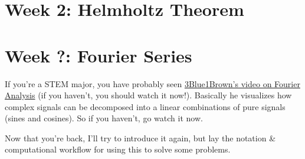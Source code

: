 \documentclass[12pt,fleqn]{article}
\numberwithin{equation}{section} %
\newcounter{problem}
\begin{document}
\newpage
\section{Week 2: Helmholtz Theorem}

\newpage
\section{Week ?: Fourier Series}
If you're a STEM major, you have probably seen \href{https://www.youtube.com/watch?v=spUNpyF58BY}
{3Blue1Brown's video on Fourier Analysis} (if you haven't, you should watch it now!). Basically he visualizes how complex signals can be decomposed into a linear combinations of pure signals (sines and cosines). So if you haven't, go watch it now.

Now that you're back, I'll try to introduce it again, but lay the notation \& computational workflow for using this to solve some problems.
\end{document}
